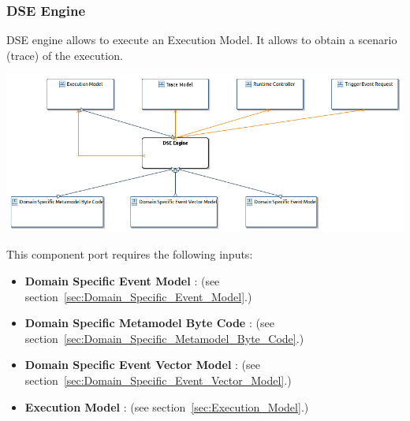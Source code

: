 \documentclass{gemoc} %
\begin{document}
\subsubsection{DSE Engine}
\label{sec:DSE_Engine}
DSE engine allows to execute an Execution Model.
It allows to obtain a scenario (trace) of the execution.
\begin{center}
\includegraphics*[trim=0.0cm 0.0cm 0cm 0.0cm, clip=true]{../images/generated/Generated_DSE_Engine.png}
\end{center}

This component port requires the following inputs:
\begin{itemize}
  \item \textbf{Domain Specific Event Model} :
(see section~\ref{sec:Domain_Specific_Event_Model}.)
  \item \textbf{Domain Specific Metamodel Byte Code} :
(see section~\ref{sec:Domain_Specific_Metamodel_Byte_Code}.)
  \item \textbf{Domain Specific Event Vector Model} :
(see section~\ref{sec:Domain_Specific_Event_Vector_Model}.)
  \item \textbf{Execution Model} :
(see section~\ref{sec:Execution_Model}.)
\end{itemize}
\end{document}
